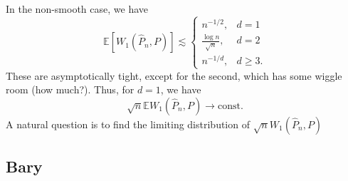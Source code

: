 \documentclass{article}
\newcommand{\E}{\mathbb{E}}
\begin{document}
In the non-smooth case, we have
\begin{equation*}
    \E[W_1(\hat{P}_n, P)] \lesssim \begin{cases}
        n^{-1/2}, &d=1\\
        \frac{\log n}{\sqrt{n}}, &d=2\\
        n^{-1/d}, &d \geq 3.
    \end{cases}
\end{equation*}
These are asymptotically tight, except for the second, which has some wiggle room (how much?). Thus, for $d=1$, we have
\begin{equation*}
    \sqrt{n} \E W_1(\hat{P}_n,P) \to \text{const}.
\end{equation*}
A natural question is to find the limiting distribution of $\sqrt{n} W_1(\hat{P}_n, P)$

\subsection{Bary}
\end{document}
